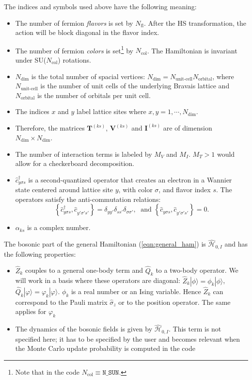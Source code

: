 The indices and symbols used above have the following meaning: 
\begin{itemize}
\item The number of fermion \emph{flavors} is set by $N_{\mathrm{fl}}$.  After the HS transformation, the action will be block diagonal in the flavor index. 
\item The number of fermion \emph{colors} is set\footnote{Note that  in the code $ N_{\mathrm{col}} \equiv \texttt{N\_{SUN}} $.} by $N_{\mathrm{col}}$.    The Hamiltonian is invariant under  SU($N_{\mathrm{col}}$)  rotations.
\item $N_{\mathrm{dim}}$ is the total number of spacial vertices: $N_{\mathrm{dim}}=N_{\text{unit-cell}} N_{\mathrm{orbital}}$, where $N_{\text{unit-cell}}$ is the number of unit cells of the underlying Bravais lattice and $N_{\mathrm{orbital}}$ is the number of  orbitals per unit cell.
\item The indices $x$ and $y$ label lattice sites where $x,y=1,\cdots, N_{\mathrm{dim}}$. 
\item Therefore, the  matrices $\bm{T}^{(k s)}$, $\bm{V}^{(ks)}$  and $\bm{I}^{(ks)}$ are  of dimension $N_{\mathrm{dim}}\times N_{\mathrm{dim}}$.
\item The number of interaction terms  is labeled by $M_V$   and $M_I$.   $M_T> 1 $ would allow for a checkerboard decomposition.
\item $\hat{c}^{\dagger}_{y \sigma s} $ is a second-quantized operator that creates an electron in a Wannier state centered around lattice site $y$, with color $\sigma$, and  flavor index $s$.  The operators satisfy the anti-commutation relations: 
\begin{equation}
	\left\{ \hat{c}^{\dagger}_{y \sigma s},    \hat{c}^{\phantom\dagger}_{y' \sigma' s'}  \right\}   =   \delta_{yy'}  \delta_{ss'} \delta_{\sigma\sigma'},   
	\; \text{ and } \left\{ \hat{c}^{\phantom\dagger}_{y \sigma s},    \hat{c}^{\phantom\dagger}_{y' \sigma' s'}  \right\}   =0.
\end{equation}
\item $\alpha_{k s}$ is a complex number.

\end{itemize}
The bosonic  part of the general Hamiltonian (\ref{eqn:general_ham}) is 
$ \hat{\mathcal{H}}_{0,I} $ and  has the following properties:
\begin{itemize}
\item $\hat{Z}_k$  couples to a general one-body term  and     $\hat{Q}_k$   to  a    two-body   operator. 
We will work in a basis where these operators are  diagonal:  $\hat{Z}_k | \phi \rangle  =  \phi_k | \phi \rangle $,  
$\hat{Q}_k | \varphi \rangle  =  \varphi_k | \varphi \rangle $.   
$\phi_k$ is a real  number   or an  Ising variable. 
Hence   $\hat{Z}_k$ can correspond  to the Pauli matrix $\hat{\sigma}_{z}$ or to the position operator.    
The  same applies  for  $\varphi_k$ 
\item  The dynamics of the bosonic fields   is given by $\hat{\mathcal{H}}_{0,I}$. This term is not specified here; 
it has to be specified by the user and becomes relevant when the Monte Carlo update probability is computed in the code
\end{itemize}

